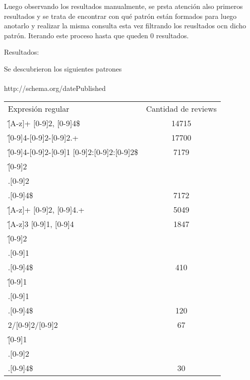 Luego observando los resultados manualmente, se prsta atención also primeros resultados y se trata de encontrar con qué patrón están formados 
para luego anotarlo y realizar la misma consulta esta vez filtrando los reusltados ocn dicho patrón. Iterando este proceso hasta que 
queden 0 resultados.

Resultados:

Se descubrieron los siguientes patrones
\\
\\
http://schema.org/datePublished
\begin{tabular}{| l | c |}
Expresión regular & Cantidad de reviews\\
\^[A-z]+ [0-9]{2}, [0-9]{4}\$ & 14715 \\
\^[0-9]{4}-[0-9]{2}-[0-9]{2}.+ & 17700 \\
\^[0-9]{4}-[0-9]{2}-[0-9]{1} [0-9]{2}:[0-9]{2}:[0-9]{2}\$ & 7179 \\
\^[0-9]{2}\\.[0-9]{2}\\.[0-9]{4}\$ & 7172\\
\^[A-z]+ [0-9]{2}, [0-9]{4}.+ & 5049\\
\^[A-z]{3} [0-9]{1}, [0-9]{4} & 1847\\
\^[0-9]{2}\\.[0-9]{1}\\.[0-9]{4}\$ & 410\\
\^[0-9]{1}\\.[0-9]{1}\\.[0-9]{4}\$ & 120\\
[0-9]{2}/[0-9]{2}/[0-9]{2} & 67\\
\^[0-9]{1}\\.[0-9]{2}\\.[0-9]{4}\$ & 30
\end{tabular}

